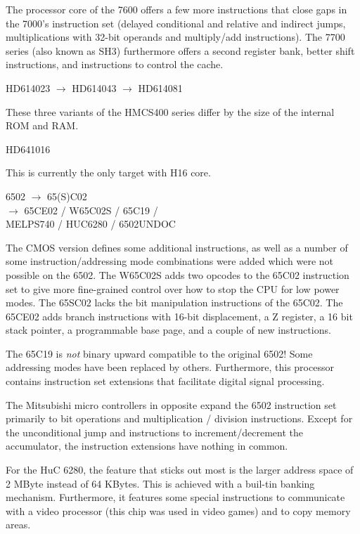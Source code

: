 \documentclass[12pt,twoside]{report}
\begin{document}
The processor core of the 7600 offers a few more instructions that
close gaps in the 7000's instruction set (delayed conditional and
relative and indirect jumps, multiplications with 32-bit operands and
multiply/add instructions).  The 7700 series (also known as SH3)
furthermore offers a second register bank, better shift instructions, and
instructions to control the cache.
\begin{cpulist}
   HD614023 $\longrightarrow$ HD614043 $\longrightarrow$ HD614081
\end{cpulist}
These three variants of the HMCS400 series differ by the size of
the internal ROM and RAM.
\begin{cpulist}
   HD641016
\end{cpulist}
This is currently the only target with H16 core.
\begin{cpulist}
   6502 $\rightarrow$ 65(S)C02 \\
\> $\rightarrow$ 65CE02 / W65C02S / 65C19 /\\
\> MELPS740 / HUC6280 / 6502UNDOC
\end{cpulist}
The CMOS version defines some additional instructions, as well as a number of
some instruction/addressing mode combinations were added which were not
possible on the 6502.  The W65C02S adds two opcodes to the 65C02 instruction
set to give more fine-grained control over how to stop the CPU for low power
modes.  The 65SC02 lacks the bit manipulation instructions of the
65C02.  The 65CE02 adds branch instructions with 16-bit displacement, a Z
register, a 16 bit stack pointer, a programmable base page, and a couple of
new instructions.

The 65C19 is {\em not} binary upward compatible to the original
6502! Some addressing modes have been replaced by others.
Furthermore, this processor contains instruction set extensions
that facilitate digital signal processing.

The Mitsubishi micro controllers in opposite expand
the 6502 instruction set primarily to bit operations and multiplication /
division instructions.  Except for the unconditional jump and instructions
to increment/decrement the accumulator, the instruction extensions
have nothing in common.

For the HuC 6280, the feature that sticks out most is the larger
address space of 2 MByte instead of 64 KBytes.  This is achieved
with a buil-tin banking mechanism.  Furthermore, it features some
special instructions to communicate with a video processor (this
chip was used in video games) and to copy memory areas.
\end{document}
